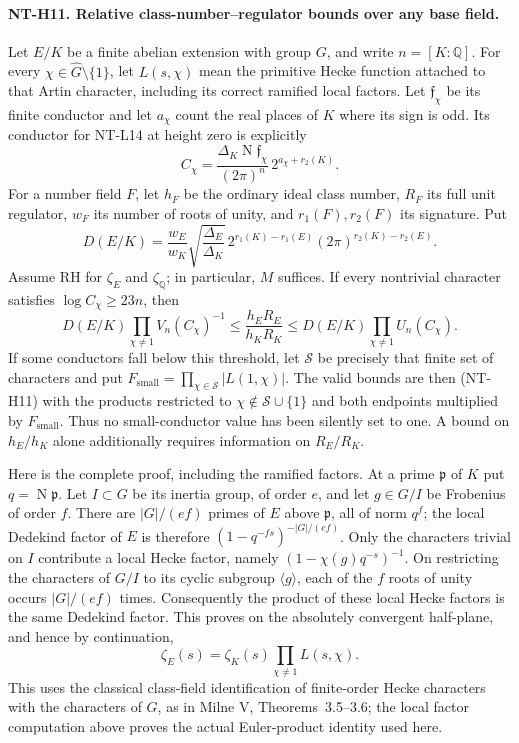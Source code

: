 \documentclass[11pt,a4paper]{article}
\begin{document}
\paragraph{NT-H11. Relative class-number--regulator bounds over any base field.}
Let $E/K$ be a finite abelian extension with group $G$, and
write $n=[K:\mathbb Q]$.
For every $\chi\in\widehat G\setminus\{1\}$, let
$L(s,\chi)$ mean the primitive Hecke function attached to that
Artin character, including its correct ramified local factors.
Let $\mathfrak f_\chi$ be its finite conductor and let
$a_\chi$ count the real places of $K$ where its sign is odd.
Its conductor for NT-L14 at height zero is explicitly
\[
 C_\chi=
 \frac{\Delta_K\operatorname N\mathfrak f_\chi}
                  {(2\pi)^n}\,2^{a_\chi+r_2(K)}.
\tag{NT-relative-conductor}
\]
For a number field $F$, let $h_F$ be the ordinary ideal class
number, $R_F$ its full unit regulator, $w_F$ its number of roots
of unity, and $r_1(F),r_2(F)$ its signature.  Put
\[
 D(E/K)=\frac{w_E}{w_K}
       \sqrt{\frac{\Delta_E}{\Delta_K}}\,
       2^{r_1(K)-r_1(E)}(2\pi)^{r_2(K)-r_2(E)}.
\]
Assume RH for $\zeta_E$ and $\zeta_{\mathbb Q}$; in particular,
$M$ suffices.  If every nontrivial character satisfies
$\log C_\chi\ge23n$, then
\[
 D(E/K)\prod_{\chi\ne1}V_n(C_\chi)^{-1}
 \le\frac{h_ER_E}{h_KR_K}
 \le D(E/K)\prod_{\chi\ne1}U_n(C_\chi).
\tag{NT-H11}
\]
If some conductors fall below this threshold, let
$\mathcal S$ be precisely that finite set of characters and
put $F_{\mathrm{small}}=\prod_{\chi\in\mathcal S}|L(1,\chi)|$.
The valid bounds are then (NT-H11) with the products restricted
to $\chi\notin\mathcal S\cup\{1\}$ and both endpoints
multiplied by $F_{\mathrm{small}}$.
Thus no small-conductor value has been silently set to one.
A bound on $h_E/h_K$ alone additionally requires information
on $R_E/R_K$.

Here is the complete proof, including the ramified factors.
At a prime $\mathfrak p$ of $K$ put $q=\operatorname N\mathfrak p$.
Let $I\subset G$ be its inertia group, of order $e$, and let
$g\in G/I$ be Frobenius of order $f$.
There are $|G|/(ef)$ primes of $E$ above $\mathfrak p$,
all of norm $q^f$; the local Dedekind factor of $E$ is therefore
$(1-q^{-fs})^{-|G|/(ef)}$.
Only the characters trivial on $I$ contribute a local Hecke
factor, namely $(1-\chi(g)q^{-s})^{-1}$.
On restricting the characters of $G/I$ to its cyclic subgroup
$\langle g\rangle$, each of the $f$ roots of unity occurs
$|G|/(ef)$ times.  Consequently the product of these local
Hecke factors is the same Dedekind factor.
This proves on the absolutely convergent half-plane, and hence
by continuation,
\[
 \zeta_E(s)=\zeta_K(s)\prod_{\chi\ne1}L(s,\chi).
\tag{NT-relative-factorization}
\]
This uses the classical class-field identification of finite-order
Hecke characters with the characters of $G$, as in Milne V,
Theorems~3.5--3.6; the local factor computation above proves
the actual Euler-product identity used here.
\end{document}
